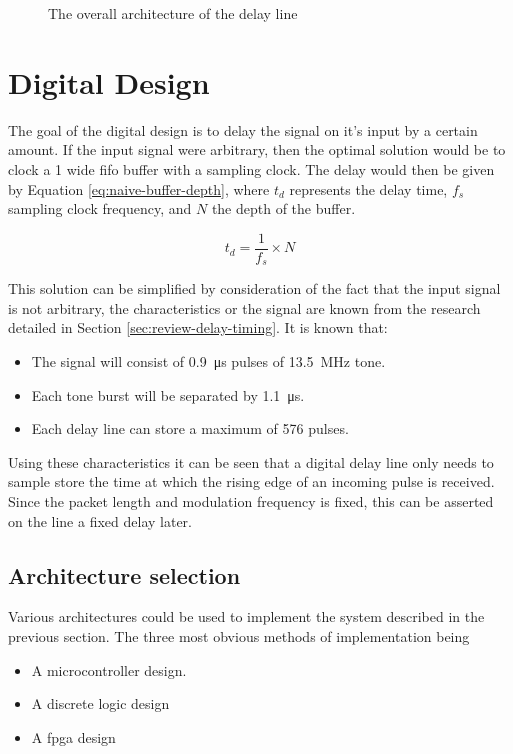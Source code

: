 \begin{figure}[ht]
	\centering

	\dummyfigure

	\caption{The overall architecture of the delay line}
	\label{fig:delay-line-arch}
\end{figure}


\section{Digital Design} \label{sec:delay-line-dig-des}

The goal of the digital design is to delay the signal on it's input by a certain amount. If the input signal were arbitrary, then the optimal solution would be to clock a \SI{1}{\bit} wide \gls{fifo} buffer with a sampling clock. The delay would then be given by Equation \ref{eq:naive-buffer-depth}, where $t_d$ represents the delay time, $f_s$ sampling clock frequency, and $N$ the depth of the buffer.

\begin{equation}
	t_d = \frac{1}{f_s} \times N \label{eq:naive-buffer-depth}
\end{equation}

This solution can be simplified by consideration of the fact that the input signal is not arbitrary, the characteristics or the signal are known from the research detailed in Section \ref{sec:review-delay-timing}. It is known that:
\begin{itemize}
	\item The signal will consist of \SI{0.9}{\micro\second} pulses of \SI{13.5}{\mega\hertz} tone.
	\item Each tone burst will be separated by \SI{1.1}{\micro\second}.
	\item Each delay line can store a maximum of 576 pulses.
\end{itemize}

Using these characteristics it can be seen that a digital delay line only needs to sample store the time at which the rising edge of an incoming pulse is received. Since the packet length and modulation frequency is fixed, this can be asserted on the line a fixed delay later.

\subsection{Architecture selection}

Various architectures could be used to implement the system described in the previous section. The three most obvious methods of implementation being
\begin{itemize}
	\item A microcontroller design.
	\item A discrete logic design
	\item A \gls{fpga} design
\end{itemize}

